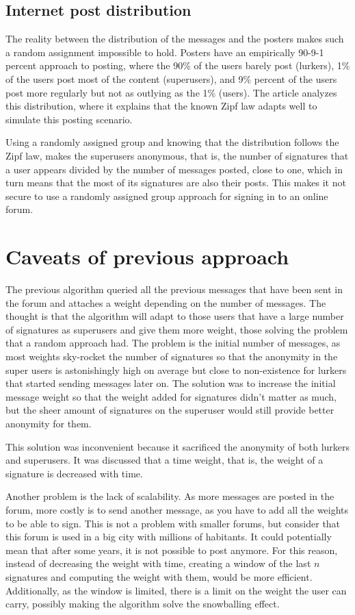 \documentclass[11pt,congress]{ieeetran}
\begin{document}
\subsection{Internet post distribution}
\label{sec:orgdc5dcbb}
The reality between the distribution of the messages and the posters makes such a random
assignment impossible to hold. Posters have an empirically 90-9-1 percent approach to posting, where the 90\%
of the users barely post (lurkers), 1\% of the users post most of the content (superusers), and 9\% percent of
the users post more regularly but not as outlying as the 1\% (users). The \cite{zipf} article analyzes this
distribution, where it explains that the known Zipf law adapts well to simulate this posting scenario.

Using a randomly assigned group and knowing that the distribution follows the Zipf law, makes the superusers
anonymous, that is, the number of signatures that a user appears divided by the number of messages posted, close to one, which in turn means that the most of its signatures are also their posts. This makes it not secure to use a randomly assigned group approach for signing in to an online forum.



\section{Caveats of previous approach}
\label{sec:org2816147}
The previous algorithm \cite{recsi} queried all the previous messages that have been sent in the forum and attaches a weight depending on the number of messages. The thought is that the algorithm will adapt to those users that have a large number of signatures as superusers and give them more weight, those solving the problem that a random approach had. The problem is the initial number of messages, as most weights sky-rocket the number of signatures so that the anonymity in the super users is astonishingly high on average but close to non-existence for lurkers that started sending messages later on. The solution was to increase the initial message weight so that the weight added for signatures didn't matter as much, but the sheer amount of signatures on the superuser would still provide better anonymity for them.

This solution was inconvenient because it sacrificed the anonymity of both lurkers and superusers. It was discussed that a time weight, that is, the weight of a signature is decreased with time.

Another problem is the lack of scalability. As more messages are posted in the forum, more costly is to send another message, as you have to add all the weights to be able to sign. This is not a problem with smaller forums, but consider that this forum is used in a big city with millions of habitants. It could potentially mean that after some years, it is not possible to post anymore. For this reason,  instead of decreasing the weight with time, creating a window of the last \(n\) signatures and computing the weight with them, would be more efficient. Additionally, as the window is limited, there is a limit on the weight the user can carry, possibly making the algorithm solve the snowballing effect.
\end{document}
